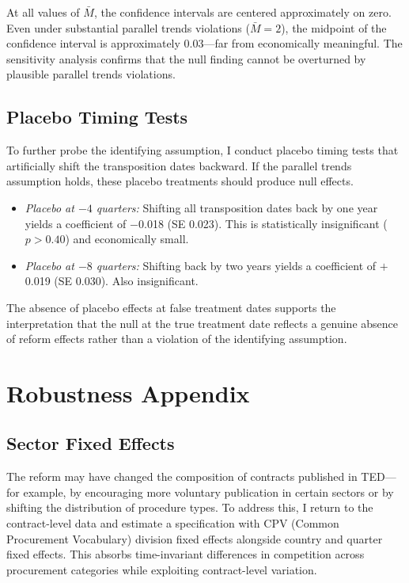 \documentclass[12pt]{article}
\begin{document}
At all values of $\bar{M}$, the confidence intervals are centered approximately on zero. Even under substantial parallel trends violations ($\bar{M} = 2$), the midpoint of the confidence interval is approximately 0.03---far from economically meaningful. The sensitivity analysis confirms that the null finding cannot be overturned by plausible parallel trends violations.

\subsection{Placebo Timing Tests}

To further probe the identifying assumption, I conduct placebo timing tests that artificially shift the transposition dates backward. If the parallel trends assumption holds, these placebo treatments should produce null effects.

\begin{itemize}
\item \textit{Placebo at $-4$ quarters:} Shifting all transposition dates back by one year yields a coefficient of $-$0.018 (SE 0.023). This is statistically insignificant ($p > 0.40$) and economically small.
\item \textit{Placebo at $-8$ quarters:} Shifting back by two years yields a coefficient of $+$0.019 (SE 0.030). Also insignificant.
\end{itemize}

The absence of placebo effects at false treatment dates supports the interpretation that the null at the true treatment date reflects a genuine absence of reform effects rather than a violation of the identifying assumption.


\section{Robustness Appendix}
\label{app:robustness}

\subsection{Sector Fixed Effects}

The reform may have changed the composition of contracts published in TED---for example, by encouraging more voluntary publication in certain sectors or by shifting the distribution of procedure types. To address this, I return to the contract-level data and estimate a specification with CPV (Common Procurement Vocabulary) division fixed effects alongside country and quarter fixed effects. This absorbs time-invariant differences in competition across procurement categories while exploiting contract-level variation.
\end{document}
